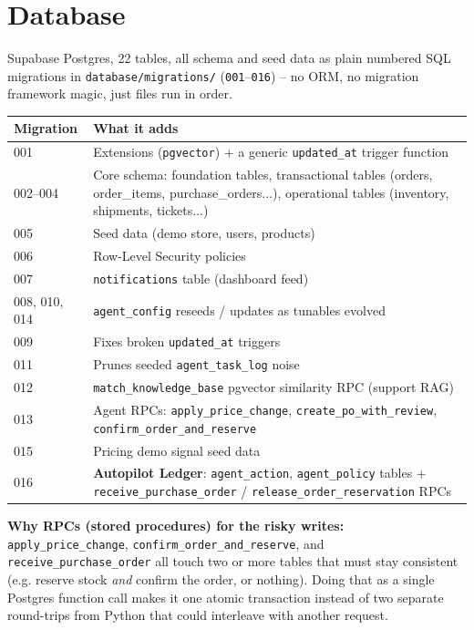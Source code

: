 \documentclass[11pt,a4paper]{article}
\begin{document}
\section{Database}

Supabase Postgres, 22 tables, all schema and seed data as plain numbered SQL migrations in
\texttt{database/migrations/} (\texttt{001}--\texttt{016}) -- no ORM, no migration framework
magic, just files run in order.

\begin{center}
\begin{tabular}{@{}p{3.6cm}p{9cm}@{}}
\toprule
\textbf{Migration} & \textbf{What it adds} \\
\midrule
001 & Extensions (\texttt{pgvector}) + a generic \texttt{updated\_at} trigger function \\
002--004 & Core schema: foundation tables, transactional tables (orders, order\_items,
purchase\_orders...), operational tables (inventory, shipments, tickets...) \\
005 & Seed data (demo store, users, products) \\
006 & Row-Level Security policies \\
007 & \texttt{notifications} table (dashboard feed) \\
008, 010, 014 & \texttt{agent\_config} reseeds / updates as tunables evolved \\
009 & Fixes broken \texttt{updated\_at} triggers \\
011 & Prunes seeded \texttt{agent\_task\_log} noise \\
012 & \texttt{match\_knowledge\_base} pgvector similarity RPC (support RAG) \\
013 & Agent RPCs: \texttt{apply\_price\_change}, \texttt{create\_po\_with\_review},
\texttt{confirm\_order\_and\_reserve} \\
015 & Pricing demo signal seed data \\
016 & \textbf{Autopilot Ledger}: \texttt{agent\_action}, \texttt{agent\_policy} tables +
\texttt{receive\_purchase\_order} / \texttt{release\_order\_reservation} RPCs \\
\bottomrule
\end{tabular}
\end{center}

\textbf{Why RPCs (stored procedures) for the risky writes:} \texttt{apply\_price\_change},
\texttt{confirm\_order\_and\_reserve}, and \texttt{receive\_purchase\_order} all touch two or
more tables that must stay consistent (e.g. reserve stock \emph{and} confirm the order, or
nothing). Doing that as a single Postgres function call makes it one atomic transaction instead
of two separate round-trips from Python that could interleave with another request.
\end{document}
